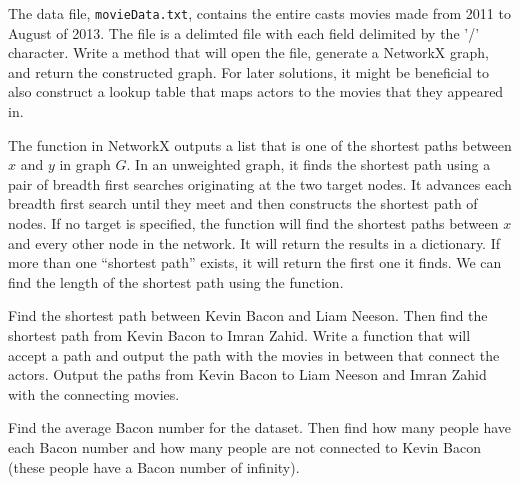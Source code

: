 \begin{problem}
The data file, \texttt{movieData.txt}, contains the entire casts movies made from 2011 to August of 2013. The file is a delimted file with each field delimited by the '/' character.
Write a method that will open the file, generate a NetworkX graph, and return the constructed graph.
For later solutions, it might be beneficial to also construct a lookup table that maps actors to the movies that they appeared in.
\end{problem}

The  function in NetworkX outputs a list that is one of the shortest paths between $x$ and $y$ in graph $G$.  In an unweighted graph, it finds the shortest path using a pair of breadth first searches originating at the two target nodes.  It advances each breadth first search until they meet and then  constructs the shortest path of nodes.  If no target is specified, the function will find the shortest paths between $x$ and every other node in the network.  It will return the results in a dictionary.  If more than one ``shortest path'' exists, it will return the first one it finds.  We can find the length of the shortest path using the  function.

\begin{problem}
Find the shortest path between Kevin Bacon and Liam Neeson. Then find the shortest path from Kevin Bacon to Imran Zahid. Write a function that will accept a path and output the path with the movies in between that connect the actors. Output the paths from Kevin Bacon to Liam Neeson and Imran Zahid with the connecting movies.
\end{problem}

\begin{problem}
Find the average Bacon number for the dataset. Then find how many people have each Bacon number and how many people are not connected to Kevin Bacon (these people have a Bacon number of infinity).
\end{problem}

